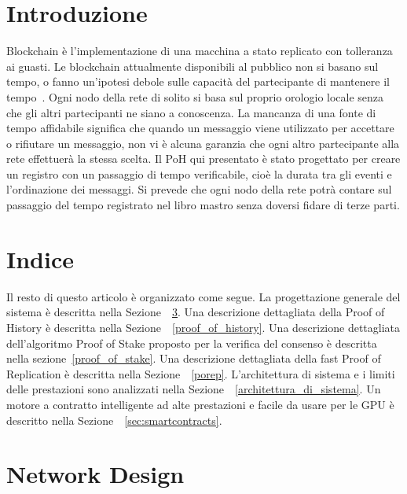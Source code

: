 \documentclass[12pt]{article}
\begin{document}
\section{Introduzione}\normalsize
Blockchain è l'implementazione di una macchina a stato replicato con tolleranza ai guasti. Le blockchain attualmente disponibili al pubblico non si basano sul tempo, o fanno un'ipotesi debole sulle capacità del partecipante di mantenere il tempo~\cite{tendermint,hashgraph}. Ogni nodo della rete di solito si basa sul proprio orologio locale senza che gli altri partecipanti ne siano a conoscenza. La mancanza di una fonte di tempo affidabile significa che quando un messaggio viene utilizzato per accettare o rifiutare un messaggio, non vi è alcuna garanzia che ogni altro partecipante alla rete effettuerà la stessa scelta. Il PoH qui presentato è stato progettato per creare un registro con un passaggio di tempo verificabile, cioè la durata tra gli eventi e l'ordinazione dei messaggi. Si prevede che ogni nodo della rete potrà contare sul passaggio del tempo registrato nel libro mastro senza doversi fidare di terze parti.

\section{Indice}
Il resto di questo articolo è organizzato come segue. La progettazione generale del sistema è descritta nella Sezione ~\ref{design}. Una descrizione dettagliata della Proof of History è descritta nella Sezione ~\ref{proof_of_history}. Una descrizione dettagliata dell'algoritmo Proof of Stake proposto per la verifica del consenso  è descritta nella sezione~\ref{proof_of_stake}. Una descrizione dettagliata della fast Proof of Replication  è descritta nella Sezione ~\ref{porep}. L'architettura di sistema e i limiti delle prestazioni sono analizzati nella Sezione ~\ref{architettura_di_sistema}. Un motore a contratto intelligente ad alte prestazioni e facile da usare per le GPU è descritto nella Sezione ~\ref{sec:smartcontracts}.

\section{Network Design}\label{design}
\end{document}
